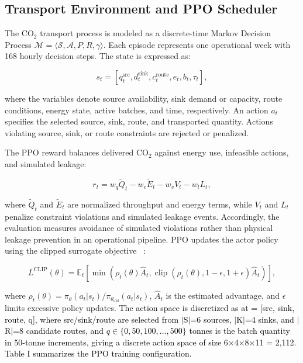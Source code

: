 \documentclass[conference]{IEEEtran}
\begin{document}
\subsection{Transport Environment and PPO Scheduler}

The CO$_2$ transport process is modeled as a discrete-time Markov Decision Process
$\mathcal{M}=\langle\mathcal{S},\mathcal{A},P,R,\gamma\rangle$.
Each episode represents one operational week with 168 hourly decision steps. The state is expressed as:

\vspace{-0.3cm}
\begin{equation}
s_t =
\left[
q_t^{\mathrm{src}},
d_t^{\mathrm{sink}},
c_t^{\mathrm{route}},
e_t,
b_t,
\tau_t
\right],
\label{eq:state}
\end{equation}

where the variables denote source availability, sink demand or capacity, route conditions, energy state, active batches, and time, respectively. An action
$a_t$ specifies the selected source, sink, route, and transported quantity. Actions violating source, sink, or route constraints are rejected or penalized.

The PPO reward balances delivered CO$_2$ against energy use, infeasible actions, and simulated leakage:

\vspace{-0.4cm}
\begin{equation}
r_t =
w_q\widetilde{Q}_t
-w_e\widetilde{E}_t
-w_vV_t
-w_lL_t,
\label{eq:reward}
\end{equation}

\vspace{-0.3cm}
where $\widetilde{Q}_t$ and $\widetilde{E}_t$ are normalized throughput and energy terms, while $V_t$ and $L_t$ penalize constraint violations and simulated leakage events. Accordingly, the evaluation measures avoidance of simulated
violations rather than physical leakage prevention in an operational pipeline. PPO updates the actor policy using the clipped surrogate objective
~\cite{schulman2017ppo}:

\vspace{-0.5cm}
\begin{equation}
L^{\mathrm{CLIP}}(\theta)=
\mathbb{E}_{t}
\left[
\min
\left(
\rho_t(\theta)\hat{A}_t,
\operatorname{clip}
\left(
\rho_t(\theta),1-\epsilon,1+\epsilon
\right)\hat{A}_t
\right)
\right],
\label{eq:ppo}
\end{equation}


\vspace{-0.1cm}
where
$\rho_t(\theta)=
\pi_{\theta}(a_t|s_t)/
\pi_{\theta_{\mathrm{old}}}(a_t|s_t)$,
$\hat{A}_t$ is the estimated advantage, and $\epsilon$ limits excessive policy updates. 
\textcolor{black}{The action space is discretized as at = [src, sink, route, q], where src/sink/route are selected from $|$S$|$=6 sources, $|$K$|$=4 sinks, and $|$R$|$=8 candidate routes, and $q \in \{0, 50, 100, \dots, 500\}$ tonnes is the batch quantity in 50-tonne increments, giving a discrete action space of size 6×4×8×11 = 2,112. Table I summarizes the PPO training configuration.}
\end{document}
